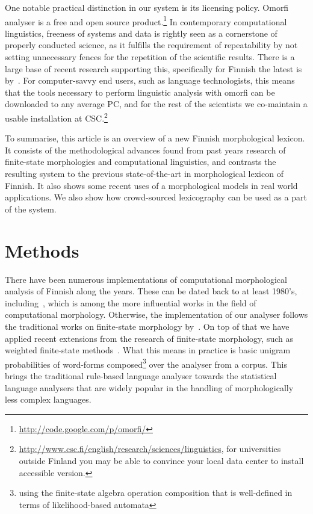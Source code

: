 \documentclass[a4paper,12pt]{article}
\begin{document}
One notable practical distinction in our system is its licensing policy. Omorfi
analyser is a free and open source product.\footnote{
\url{http://code.google.com/p/omorfi/}}  In contemporary computational
linguistics, freeness of systems and data is rightly seen as a cornerstone of
properly conducted science, as it fulfills the requirement of repeatability by
not setting unnecessary fences for the repetition of the scientific results.
There is a large base of recent research supporting this, specifically for
Finnish the latest is by~\citet{koskenniemi2008build}. For computer-savvy end
users, such as language technologists, this means that the tools necessary to
perform linguistic analysis with omorfi can be downloaded to any average PC,
and for the rest of the scientists we co-maintain a usable installation at
CSC.\footnote{\url{http://www.csc.fi/english/research/sciences/linguistics}, 
for universities outside Finland you may be able to convince your local data
center to install accessible version.}

To summarise, this article is an overview of a new Finnish morphological
lexicon.  It consists of the methodological advances found from past years
research of finite-state morphologies and computational linguistics, and
contrasts the resulting system to the previous state-of-the-art in
morphological lexicon of Finnish. It also shows some recent uses of a
morphological models in real world applications. We also show how
crowd-sourced lexicography can be used as a part of the system.

\section{Methods}
\label{sec:methods}

There have been numerous implementations of
computational morphological analysis of Finnish along
the years. These  can be dated back to at least
1980's, including~\citet{koskenniemi1983twolevel},
which is among the more influential works in the
field of computational morphology.  Otherwise, the
implementation of our analyser follows the
traditional works on finite-state morphology
by~\citet{beesley2003finite}. On top of that we have
applied recent extensions from the research of
finite-state morphology, such as weighted
finite-state methods~\citep{openfst,hfst2012}. What
this means in practice is basic unigram probabilities
of word-forms composed\footnote{using the
finite-state algebra operation composition that is
well-defined in terms of likelihood-based automata}
over the analyser from a corpus.  This brings the
traditional rule-based language analyser towards the
statistical language analysers that are widely
popular in the handling of morphologically less
complex languages.
\end{document}
